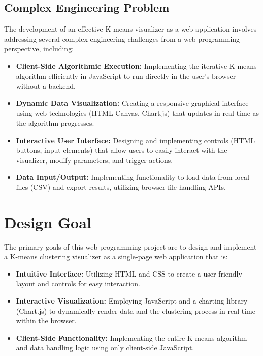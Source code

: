 \documentclass[12pt]{report}
\begin{document}
\subsection{Complex Engineering Problem}
The development of an effective K-means visualizer as a web application involves addressing several complex engineering challenges from a web programming perspective, including:
\begin{itemize}
    \item \textbf{Client-Side Algorithmic Execution:} Implementing the iterative K-means algorithm efficiently in JavaScript to run directly in the user's browser without a backend.
    \item \textbf{Dynamic Data Visualization:} Creating a responsive graphical interface using web technologies (HTML Canvas, Chart.js) that updates in real-time as the algorithm progresses.
    \item \textbf{Interactive User Interface:} Designing and implementing controls (HTML buttons, input elements) that allow users to easily interact with the visualizer, modify parameters, and trigger actions.
    \item \textbf{Data Input/Output:} Implementing functionality to load data from local files (CSV) and export results, utilizing browser file handling APIs.
\end{itemize}

\section{Design Goal}
The primary goals of this web programming project are to design and implement a K-means clustering visualizer as a single-page web application that is:
\begin{itemize}
    \item \textbf{Intuitive Interface:} Utilizing HTML and CSS to create a user-friendly layout and controls for easy interaction.
    \item \textbf{Interactive Visualization:} Employing JavaScript and a charting library (Chart.js) to dynamically render data and the clustering process in real-time within the browser.
    \item \textbf{Client-Side Functionality:} Implementing the entire K-means algorithm and data handling logic using only client-side JavaScript.
\end{itemize}
\end{document}
